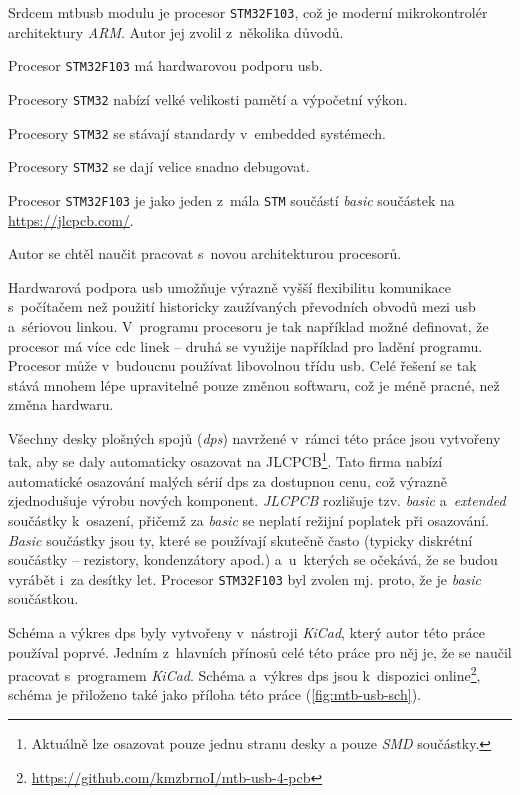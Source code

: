 Srdcem \gls{mtbusb} modulu je procesor \texttt{STM32F103}, což je moderní
mikrokontrolér architektury \textit{ARM}. Autor jej zvolil z~několika důvodů.

\begin{compactenum}
\item Procesor \texttt{STM32F103} má hardwarovou podporu \gls{usb}.
\item Procesory \texttt{STM32} nabízí velké velikosti pamětí a výpočetní výkon.
\item Procesory \texttt{STM32} se stávají standardy v~embedded systémech.
\item Procesory \texttt{STM32} se dají velice snadno debugovat.
\item Procesor \texttt{STM32F103} je jako jeden z~mála \texttt{STM} součástí
	\textit{basic} součástek na \url{https://jlcpcb.com/}.
\item Autor se chtěl naučit pracovat s~novou architekturou procesorů.
\end{compactenum}

Hardwarová podpora \gls{usb} umožňuje výrazně vyšší flexibilitu komunikace
s~počítačem než použití historicky zaužívaných převodních obvodů mezi
\gls{usb} a~sériovou linkou. V~programu procesoru je tak například
možné definovat, že procesor má více \gls{cdc} linek – druhá se využije například
pro ladění programu. Procesor může v~budoucnu používat libovolnou třídu
\gls{usb}. Celé řešení se tak stává mnohem lépe upravitelné pouze změnou
softwaru, což je méně pracné, než změna hardwaru.

Všechny desky plošných spojů (\textit{\gls{dps}}) navržené v~rámci této práce
jsou vytvořeny tak, aby se daly automaticky osazovat na
JLCPCB\footnote{Aktuálně lze osazovat pouze jednu stranu
desky a pouze \textit{SMD} součástky.}. Tato firma nabízí automatické osazování
malých sérií \gls{dps} za dostupnou cenu, což výrazně zjednodušuje výrobu nových
komponent. \textit{JLCPCB} rozlišuje tzv. \textit{basic} a~\textit{extended}
součástky k~osazení, přičemž za \textit{basic} se neplatí režijní poplatek při
osazování. \textit{Basic} součástky jsou ty, které se používají skutečně často
(typicky diskrétní součástky – rezistory, kondenzátory apod.) a~u~kterých se
očekává, že se budou vyrábět i~za desítky let. Procesor \texttt{STM32F103} byl
zvolen mj. proto, že je \textit{basic} součástkou.

Schéma a výkres \gls{dps} byly vytvořeny v~nástroji \textit{KiCad},
který autor této práce používal poprvé. Jedním z~hlavních přínosů celé této
práce pro něj je, že se naučil pracovat s~programem \textit{KiCad}. Schéma
a~výkres \gls{dps} jsou k~dispozici
online\footnote{\url{https://github.com/kmzbrnoI/mtb-usb-4-pcb}}, schéma je
přiloženo také jako příloha této práce (\ref{fig:mtb-usb-sch}).

